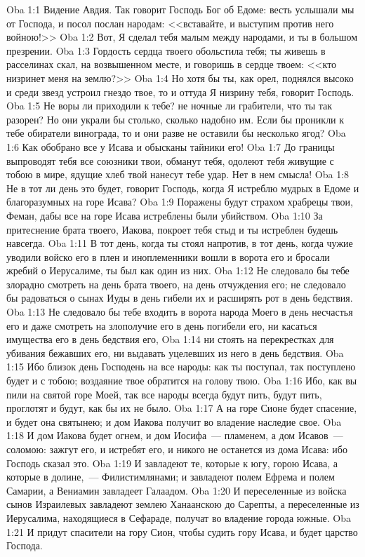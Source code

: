 \vs Oba 1:1 Видение Авдия. Так говорит Господь Бог об Едоме: весть услышали мы от Господа, и посол послан  народам: <<вставайте, и выступим против него войною!>>
\vs Oba 1:2 Вот, Я сделал тебя малым между народами, и ты в большом презрении.
\vs Oba 1:3 Гордость сердца твоего обольстила тебя; ты живешь в расселинах скал, на возвышенном месте, и говоришь в сердце твоем: <<кто низринет меня на землю?>>
\vs Oba 1:4 Но хотя бы ты, как орел, поднялся высоко и среди звезд устроил гнездо твое, то и оттуда Я низрину тебя, говорит Господь.
\vs Oba 1:5 Не воры ли приходили к тебе? не ночные ли грабители, что ты так разорен? Но они украли бы столько, сколько надобно им. Если бы проникли к тебе обиратели винограда, то и они разве не оставили бы несколько ягод?
\vs Oba 1:6 Как обобрано все у Исава и обысканы тайники его!
\vs Oba 1:7 До границы выпроводят тебя все союзники твои, обманут тебя, одолеют тебя живущие с тобою в мире, ядущие хлеб твой нанесут тебе удар. Нет в нем смысла!
\vs Oba 1:8 Не в тот ли день это будет, говорит Господь, когда Я истреблю мудрых в Едоме и благоразумных на горе Исава?
\vs Oba 1:9 Поражены будут страхом храбрецы твои, Феман, дабы все на горе Исава истреблены были убийством.
\vs Oba 1:10 За притеснение брата твоего, Иакова, покроет тебя стыд и ты истреблен будешь навсегда.
\vs Oba 1:11 В тот день, когда ты стоял напротив, в тот день, когда чужие уводили войско его в плен и иноплеменники вошли в ворота его и бросали жребий о Иерусалиме, ты был как один из них.
\vs Oba 1:12 Не следовало бы тебе злорадно смотреть на день брата твоего, на день отчуждения его; не следовало бы радоваться о сынах Иуды в день гибели их и расширять рот в день бедствия.
\vs Oba 1:13 Не следовало бы тебе входить в ворота народа Моего в день несчастья его и даже смотреть на злополучие его в день погибели его, ни касаться имущества его в день бедствия его,
\vs Oba 1:14 ни стоять на перекрестках для убивания бежавших его, ни выдавать уцелевших из него в день бедствия.
\vs Oba 1:15 Ибо близок день Господень на все народы: как ты поступал, так поступлено будет и с тобою; воздаяние твое обратится на голову твою.
\vs Oba 1:16 Ибо, как вы пили на святой горе Моей, так все народы всегда будут пить, будут пить, проглотят и будут, как бы их не было.
\vs Oba 1:17 А на горе Сионе будет спасение, и будет она святынею; и дом Иакова получит во владение наследие свое.
\vs Oba 1:18 И дом Иакова будет огнем, и дом Иосифа~--- пламенем, а дом Исавов~--- соломою: зажгут его, и истребят его, и никого не останется из дома Исава: ибо Господь сказал это.
\vs Oba 1:19 И завладеют те, которые к югу, горою Исава, а которые в долине,~--- Филистимлянами; и завладеют полем Ефрема и полем Самарии, а Вениамин завладеет Галаадом.
\vs Oba 1:20 И переселенные из войска сынов Израилевых завладеют землею Ханаанскою до Сарепты, а переселенные из Иерусалима, находящиеся в Сефараде, получат во владение города южные.
\vs Oba 1:21 И придут спасители на гору Сион, чтобы судить гору Исава, и будет царство Господа.
